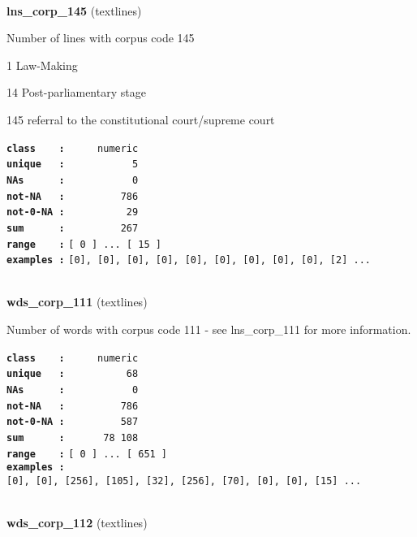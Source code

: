 \documentclass[]{article}
\begin{document}
~

\textbf{lns\_corp\_145} (textlines)

Number of lines with corpus code 145

1 Law-Making

14 Post-parliamentary stage

145 referral to the constitutional court/supreme court

\textbf{\texttt{class\ \ \ \ :}} \texttt{~~~~~numeric}\\
\textbf{\texttt{unique\ \ \ :}} \texttt{~~~~~~~~~~~5}\\
\textbf{\texttt{NAs\ \ \ \ \ \ :}} \texttt{~~~~~~~~~~~0}\\
\textbf{\texttt{not-NA\ \ \ :}} \texttt{~~~~~~~~~786}\\
\textbf{\texttt{not-0-NA\ :}} \texttt{~~~~~~~~~~29}\\
\textbf{\texttt{sum\ \ \ \ \ \ :}} \texttt{~~~~~~~~~267}\\
\textbf{\texttt{range\ \ \ \ :}}
\texttt{{[}\ 0\ {]}\ ...\ {[}\ 15\ {]}}\\
\textbf{\texttt{examples\ :}}
\texttt{{[}0{]},\ {[}0{]},\ {[}0{]},\ {[}0{]},\ {[}0{]},\ {[}0{]},\ {[}0{]},\ {[}0{]},\ {[}0{]},\ {[}2{]}\ ...}\\

~

\textbf{wds\_corp\_111} (textlines)

Number of words with corpus code 111 - see lns\_corp\_111 for more
information.

\textbf{\texttt{class\ \ \ \ :}} \texttt{~~~~~numeric}\\
\textbf{\texttt{unique\ \ \ :}} \texttt{~~~~~~~~~~68}\\
\textbf{\texttt{NAs\ \ \ \ \ \ :}} \texttt{~~~~~~~~~~~0}\\
\textbf{\texttt{not-NA\ \ \ :}} \texttt{~~~~~~~~~786}\\
\textbf{\texttt{not-0-NA\ :}} \texttt{~~~~~~~~~587}\\
\textbf{\texttt{sum\ \ \ \ \ \ :}} \texttt{~~~~~~78~108}\\
\textbf{\texttt{range\ \ \ \ :}}
\texttt{{[}\ 0\ {]}\ ...\ {[}\ 651\ {]}}\\
\textbf{\texttt{examples\ :}}
\texttt{{[}0{]},\ {[}0{]},\ {[}256{]},\ {[}105{]},\ {[}32{]},\ {[}256{]},\ {[}70{]},\ {[}0{]},\ {[}0{]},\ {[}15{]}\ ...}\\

~

\textbf{wds\_corp\_112} (textlines)
\end{document}
